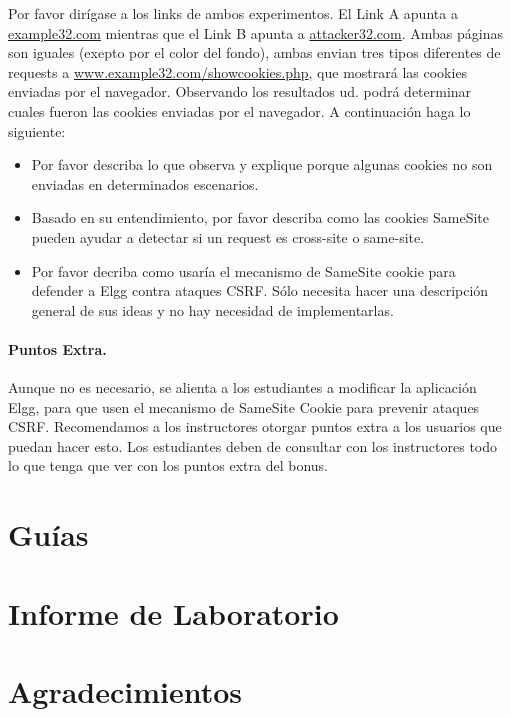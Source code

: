 Por favor dirígase a los links de ambos experimentos. El Link A apunta a \url{example32.com} mientras que el Link B apunta a \url{attacker32.com}. Ambas páginas son iguales (exepto por el color del fondo), ambas envian tres tipos diferentes de requests a \url{www.example32.com/showcookies.php}, que mostrará las cookies enviadas por el navegador. Observando los resultados ud. podrá determinar cuales fueron las cookies enviadas por el navegador. A continuación haga lo siguiente:


\begin{itemize}
\item Por favor describa lo que observa y explique porque algunas cookies no son enviadas en determinados escenarios.

\item Basado en su entendimiento, por favor describa como las cookies SameSite pueden ayudar a detectar si un request es cross-site o same-site.


\item Por favor decriba como usaría el mecanismo de SameSite cookie para defender a Elgg contra ataques CSRF. Sólo necesita hacer una descripción general de sus ideas y no hay necesidad de implementarlas.
\end{itemize}


\paragraph{Puntos Extra.} Aunque no es necesario, se alienta a los estudiantes a modificar la aplicación Elgg, para que usen el mecanismo de SameSite Cookie para prevenir ataques CSRF. Recomendamos a los instructores otorgar puntos extra a los usuarios que puedan hacer esto. Los estudiantes deben de consultar con los instructores todo lo que tenga que ver con los puntos extra del bonus.


\section{Guías}





\section{Informe de Laboratorio}




\section*{Agradecimientos}








